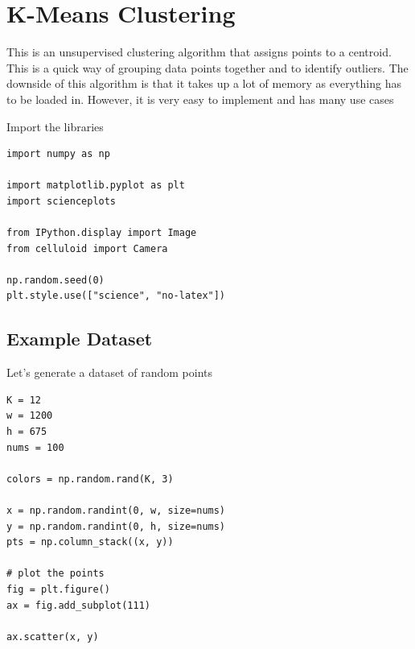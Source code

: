 \documentclass[openany]{book}
\begin{document}
    \section{K-Means Clustering}\label{k-means-clustering}

This is an unsupervised clustering algorithm that assigns points to a
centroid. This is a quick way of grouping data points together and to
identify outliers. The downside of this algorithm is that it takes up a
lot of memory as everything has to be loaded in. However, it is very
easy to implement and has many use cases

    Import the libraries

\begin{tcolorbox}
\tiny
\begin{verbatim}
import numpy as np

import matplotlib.pyplot as plt
import scienceplots

from IPython.display import Image
from celluloid import Camera

np.random.seed(0)
plt.style.use(["science", "no-latex"])
\end{verbatim}
\end{tcolorbox}

    \subsection{Example Dataset}\label{example-dataset}

Let's generate a dataset of random points

\begin{tcolorbox}
\tiny
\begin{verbatim}
K = 12
w = 1200
h = 675
nums = 100

colors = np.random.rand(K, 3)

x = np.random.randint(0, w, size=nums)
y = np.random.randint(0, h, size=nums)
pts = np.column_stack((x, y))

# plot the points
fig = plt.figure()
ax = fig.add_subplot(111)

ax.scatter(x, y)
\end{verbatim}
\end{tcolorbox}
        
\end{document}
